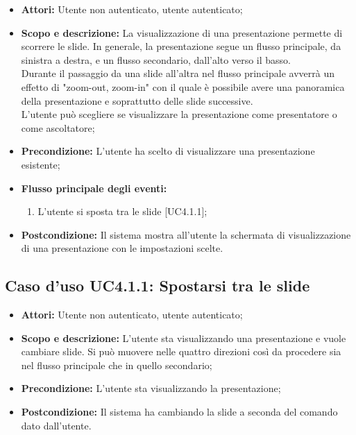 \begin{itemize}
	\item \textbf{Attori:} Utente non autenticato, utente autenticato;
	\item \textbf{Scopo e descrizione:} La visualizzazione di una presentazione permette di scorrere le \gls{slide}. In generale, la presentazione segue un flusso principale, da sinistra a destra, e un flusso secondario, dall'alto verso il basso.\\
	Durante il passaggio da una \gls{slide} all'altra nel flusso principale avverrà un effetto di "zoom-out, zoom-in" con il quale è possibile avere una panoramica della presentazione e soprattutto delle \gls{slide} successive.\\
	L'utente può scegliere se visualizzare la presentazione come presentatore o come ascoltatore;
	\item \textbf{Precondizione:} L'utente ha scelto di visualizzare una presentazione esistente;
	\item \textbf{Flusso principale degli eventi:}
	\begin{enumerate}
		\item L'utente si sposta tra le \gls{slide} [UC4.1.1];
	\end{enumerate}
	\item \textbf{Postcondizione:} Il sistema mostra all'utente la schermata di visualizzazione di una presentazione con le impostazioni scelte.
\end{itemize}

\subsection{Caso d'uso UC4.1.1: Spostarsi tra le slide}
\begin{itemize}
	\item \textbf{Attori:} Utente non autenticato, utente autenticato;
	\item \textbf{Scopo e descrizione:} L'utente sta visualizzando una presentazione e vuole cambiare \gls{slide}. Si può muovere nelle quattro direzioni così da procedere sia nel flusso principale che in quello secondario;
	\item \textbf{Precondizione:} L'utente sta visualizzando la presentazione;
	\item \textbf{Postcondizione:} Il sistema ha cambiando la \gls{slide} a seconda del comando dato dall'utente.
\end{itemize}


